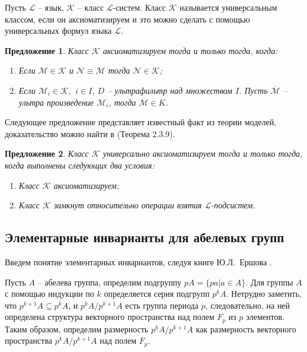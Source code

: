 \documentclass[a4paper,11pt,twoside]{article}
\newtheorem{proposition}{Предложение}[section]
\def\K{{\mathcal{K}}}
\def\L{{\mathcal{L}}}
\begin{document}
Пусть $\L$ -- язык, $\K$ -- класс $\L$-систем. Класс $\K$ называется универсальным классом, если он аксиоматизируем и это можно сделать с помощью универсальных формул языка $\L$.

\begin{proposition}\label{prop:AxiomClass}
Класс $\K$ аксиоматизируем тогда и только тогда, когда:
\begin{enumerate}
\item Если $\mathcal{M} \in \K$ и $\mathcal{N} \equiv \mathcal{M}$ тогда $\mathcal{N} \in \K$;
\item Если $\mathcal{M}_i \in \K,$ $i \in I$, $D$ -- ультрафильтр над множеством $I$. Пусть $\overline{\mathcal{M}}$ -- ультра произведение $\mathcal{M}_i$, тогда $\overline{\mathcal{M}} \in K$.
\end{enumerate}
\end{proposition}

Следующее предложение представляет известный факт из теории моделей, доказательство можно найти в \cite{DM} (Теорема 2.3.9).
\begin{proposition}\label{prop:AxiomClass2}
Класс $\K$ универсально аксиоматизируем тогда и только тогда, когда выполнены следующих два условия:
\begin{enumerate}
\item Класс $\K$ аксиоматизируем;
\item Класс $\K$ замкнут относительно операции взятия $\L$-подсистем.
\end{enumerate}
\end{proposition}



\subsection{Элементарные инварианты для абелевых групп}\label{sec:UnivInvariants}

Введем понятие элементарных инвариантов, следуя книге Ю.Л.~Ершова \cite{Ershov}.

Пусть $A$ -- абелева группа, определим подгруппу $pA = \{ pa | a \in A\}$. Для группы $A$ с помощью индукции по $k$ определяется серия подгрупп $p^k A$. Нетрудно заметить, что $p^{k+1} A \subseteq p^k A$, и $p^k A \Big/ p^{k+1} A$ есть группа периода $p$, следовательно, на ней определена структура векторного пространства над полем $F_p$ из $p$ элементов. Таким образом, определим размерность $p^k A \Big/ p^{k+1} A$ как размерность векторного пространства $p^k A \Big/ p^{k+1} A$ над полем $F_p$.
\end{document}
